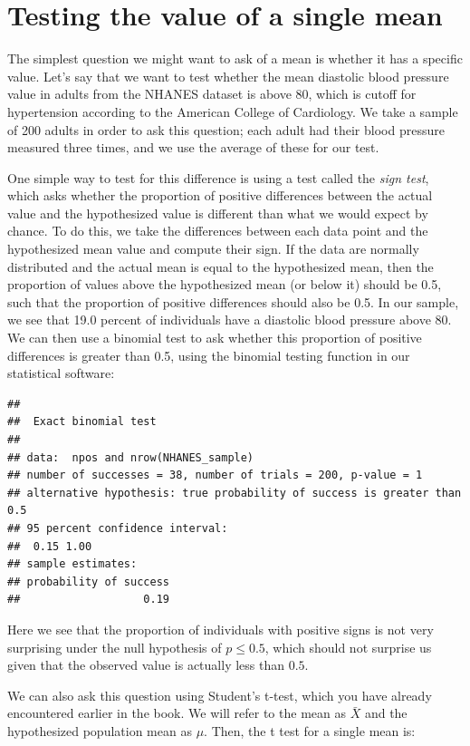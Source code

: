 \documentclass[12pt,]{book}
\theoremstyle{definition}
\theoremstyle{definition}
\theoremstyle{definition}
\theoremstyle{remark}
\begin{document}
\hypertarget{single-mean}{%
\section{Testing the value of a single mean}\label{single-mean}}

The simplest question we might want to ask of a mean is whether it has a specific value. Let's say that we want to test whether the mean diastolic blood pressure value in adults from the NHANES dataset is above 80, which is cutoff for hypertension according to the American College of Cardiology. We take a sample of 200 adults in order to ask this question; each adult had their blood pressure measured three times, and we use the average of these for our test.

One simple way to test for this difference is using a test called the \emph{sign test}, which asks whether the proportion of positive differences between the actual value and the hypothesized value is different than what we would expect by chance. To do this, we take the differences between each data point and the hypothesized mean value and compute their sign. If the data are normally distributed and the actual mean is equal to the hypothesized mean, then the proportion of values above the hypothesized mean (or below it) should be 0.5, such that the proportion of positive differences should also be 0.5. In our sample, we see that 19.0 percent of individuals have a diastolic blood pressure above 80. We can then use a binomial test to ask whether this proportion of positive differences is greater than 0.5, using the binomial testing function in our statistical software:

\begin{verbatim}
## 
##  Exact binomial test
## 
## data:  npos and nrow(NHANES_sample)
## number of successes = 38, number of trials = 200, p-value = 1
## alternative hypothesis: true probability of success is greater than 0.5
## 95 percent confidence interval:
##  0.15 1.00
## sample estimates:
## probability of success 
##                   0.19
\end{verbatim}

Here we see that the proportion of individuals with positive signs is not very surprising under the null hypothesis of \(p \le 0.5\), which should not surprise us given that the observed value is actually less than \(0.5\).

We can also ask this question using Student's t-test, which you have already encountered earlier in the book. We will refer to the mean as \(\bar{X}\) and the hypothesized population mean as \(\mu\). Then, the t test for a single mean is:
\end{document}
